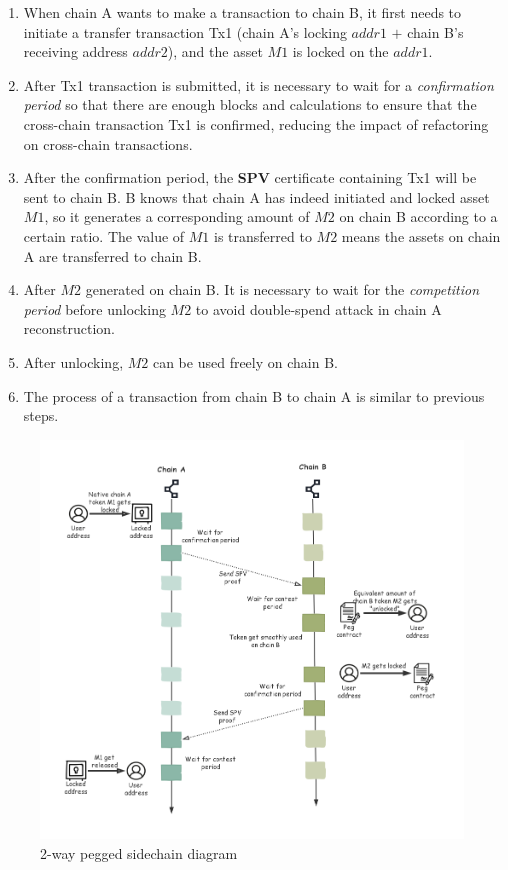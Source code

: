 \begin{enumerate}
    \item When chain A wants to make a transaction to chain B, it first needs to initiate a transfer transaction Tx1 (chain A's locking $addr1$ $+$ chain B's receiving address $addr2$), and the asset $M1$ is locked on the $addr1$.
    \item After Tx1 transaction is submitted, it is necessary to wait for a \textit{confirmation period} so that there are enough blocks and calculations to ensure that the cross-chain transaction Tx1 is confirmed, reducing the impact of refactoring on cross-chain transactions.
    \item After the confirmation period, the \textbf{SPV} certificate containing Tx1 will be sent to chain B. B knows that chain A has indeed initiated and locked asset $M1$, so it generates a corresponding amount of $M2$ on chain B according to a certain ratio. The value of $M1$ is transferred to $M2$ means the assets on chain A are transferred to chain B.
    \item After $M2$ generated on chain B. It is necessary to wait for the \textit{competition period} before unlocking $M2$ to avoid double-spend attack in chain A reconstruction.
    \item After unlocking, $M2$ can be used freely on chain B.
    \item The process of a transaction from chain B to chain A is similar to previous steps.
\end{enumerate}
        \begin{figure}[h]
        \includegraphics[width=1\textwidth]{./figures/2way.png}
        \centering
        \caption{{2-way pegged sidechain diagram}\protect\footnotemark[1]}
        \centering
        \label{fig:2way}
        
        \end{figure}
